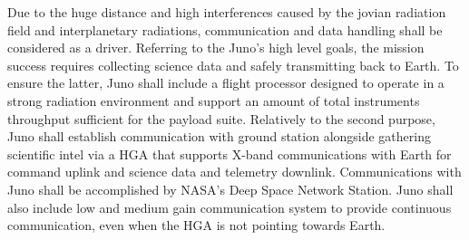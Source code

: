 \begin{enumerate}
    Due to the huge distance and high interferences caused by the jovian radiation field and interplanetary radiations, communication and data handling shall be considered as a driver. Referring to the Juno’s high level goals, the mission success requires collecting science data and safely transmitting back to Earth. To ensure the latter, Juno shall include a flight processor designed to operate in a strong radiation environment and support an amount of total instruments throughput sufficient for the payload suite. Relatively to the second purpose, Juno shall establish communication with ground station alongside gathering scientific intel via a HGA that supports X-band communications with Earth for command uplink and science data and telemetry downlink. Communications with Juno shall be accomplished by NASA’s Deep Space Network Station.
    Juno shall also include low and medium gain communication system to provide continuous communication, even when the HGA is not pointing towards Earth.

\end{enumerate}